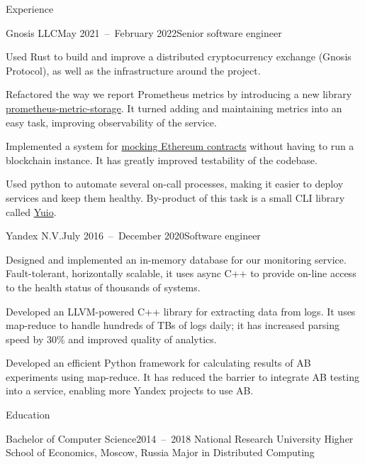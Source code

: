\documentclass{resume}
\begin{document}
    \begin{rSection}{Experience}
        \begin{rSubsection}{Gnosis LLC}{May 2021~--~February 2022}{Senior software engineer}{}
            \item
                Used Rust to build and improve
                a distributed cryptocurrency exchange (Gnosis Protocol),
                as well as the infrastructure around the project.
            \item
                Refactored the way we report Prometheus metrics
                by introducing a new library
                \href{https://github.com/taminomara/prometheus-metric-storage}{prometheus-metric-storage}.
                It turned adding and maintaining metrics into an easy task,
                improving observability of the service.
            \item
                Implemented a system for
                \href{https://docs.rs/ethcontract-mock/latest/ethcontract_mock/}{mocking Ethereum contracts}
                without having to run a blockchain instance.
                It has greatly improved testability of the codebase.
            \item
                Used python to automate several on-call processes,
                making it easier to deploy services and keep them healthy.
                By-product of this task is a small CLI library called
                \href{https://github.com/taminomara/yuio}{Yuio}.
        \end{rSubsection}

        \begin{rSubsection}{Yandex N.V.}{July 2016~--~December 2020}{Software engineer}{}
            \item
                Designed and implemented an in-memory database
                for our monitoring service.
                Fault-tolerant, horizontally scalable,
                it uses async C++ to provide on-line access
                to the health status of thousands of systems.
            \item
                Developed an LLVM-powered C++ library
                for extracting data from logs.
                It uses map-reduce to handle hundreds of TBs of logs daily;
                it has increased parsing speed
                by 30\% and improved quality of analytics.
            \item
                Developed an efficient Python framework
                for calculating results of AB experiments using map-reduce.
                It has reduced the barrier
                to integrate AB testing into a service,
                enabling more Yandex projects to use AB\@.
        \end{rSubsection}
    \end{rSection}

    \begin{rSection}{Education}
        \begin{rSubsection}{Bachelor of Computer Science}{2014~--~2018}
        {National Research University Higher School of Economics, Moscow, Russia}{}
            Major in Distributed Computing
        \end{rSubsection}
    \end{rSection}
\end{document}

